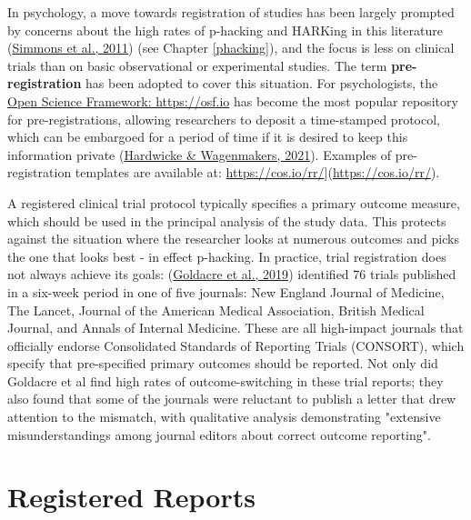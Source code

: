 \documentclass{krantz}
\begin{document}
In psychology, a move towards registration of studies has been largely prompted by concerns about the high rates of p-hacking and HARKing in this literature (\protect\hyperlink{ref-simmons2011}{Simmons et al., 2011}) (see Chapter \ref{phacking}), and the focus is less on clinical trials than on basic observational or experimental studies. The term \textbf{pre-registration} has been adopted to cover this situation. For psychologists, the \href{https://osf.io}{Open Science Framework: https://osf.io} has become the most popular repository for pre-registrations, allowing researchers to deposit a time-stamped protocol, which can be embargoed for a period of time if it is desired to keep this information private (\protect\hyperlink{ref-hardwicke2021}{Hardwicke \& Wagenmakers, 2021}). Examples of pre-registration templates are available at: \url{https://cos.io/rr/}{]}(\url{https://cos.io/rr/}).

\begin{tcolorbox}[colback=Black!5!lightgray,colframe=black!75!black,coltitle=white,title=Does trial registration prevent outcome-switching?]\label{box:switch}
A registered clinical trial protocol typically specifies a primary outcome measure, which should be used in the principal analysis of the study data. This protects against the situation where the researcher looks at numerous outcomes and picks the one that looks best - in effect p-hacking. In practice, trial registration does not always achieve its goals: (\protect\hyperlink{ref-goldacre2019}{Goldacre et al., 2019}) identified 76 trials published in a six-week period in one of five journals: New England Journal of Medicine, The Lancet, Journal of the American Medical Association, British Medical Journal, and Annals of Internal Medicine. These are all high-impact journals that officially endorse Consolidated Standards of Reporting Trials (CONSORT), which specify that pre-specified primary outcomes should be reported. Not only did Goldacre et al find high rates of outcome-switching in these trial reports; they also found that some of the journals were reluctant to publish a letter that drew attention to the mismatch, with qualitative analysis demonstrating "extensive misunderstandings among journal editors about correct outcome reporting".
\end{tcolorbox}


\hypertarget{registered-reports}{%
\section{Registered Reports}\label{registered-reports}}
\end{document}
